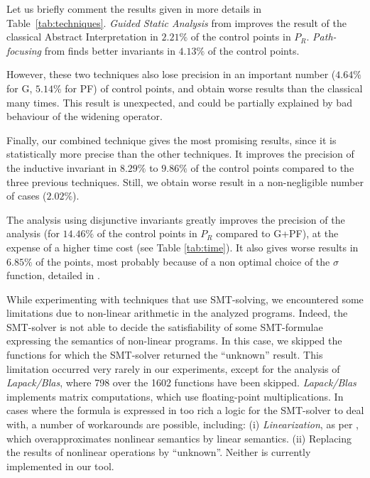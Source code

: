 \documentclass{entcs}
\begin{document}
Let us briefly comment the results given in more details in Table~\ref{tab:techniques}.
\emph{Guided Static Analysis} from \citet{DBLP:conf/sas/GopanR07} improves the
result of the classical Abstract Interpretation in $2.21\%$ of the control points
in $P_R$.
\emph{Path-focusing} from \citet{Monniaux_Gonnord_SAS11} 
finds better invariants in $4.13\%$ of the control points.

However, these two techniques also lose precision in an important number
($4.64\%$ for G, $5.14\%$ for PF) of control points, and obtain worse results
than the classical many times. This result is unexpected, and could be partially
explained by bad behaviour of the widening operator.


Finally, our combined technique gives the most promising results, since it is
statistically more precise than the other techniques. It improves the precision
of the inductive invariant in $8.29\%$ to $9.86\%$ of the control points
compared to the three previous techniques. Still, we obtain worse result in a
non-negligible number of cases ($2.02\%$).

The analysis using disjunctive invariants greatly improves the
precision of the analysis (for $14.46\%$ of the control points in $P_R$ compared
to G+PF), at the expense of a higher time cost (see Table \ref{tab:time}).
It also gives worse results in $6.85\%$ of the points, most probably because of
a non optimal choice of the $\sigma$ function, detailed in
\cite{Henry_Monniaux_Moy_SAS12}.

While experimenting with techniques that use SMT-solving, we encountered some
limitations due to non-linear arithmetic in the analyzed programs. Indeed, 
the SMT-solver is not able to decide the satisfiability of some SMT-formulae
expressing the semantics of non-linear programs. 
In this case, we skipped the functions for which the SMT-solver returned the
``unknown'' result.
This limitation occurred very rarely in our experiments, except for the analysis
of \emph{Lapack/Blas}, where 798 over the 1602 functions have been skipped.
\emph{Lapack/Blas} implements matrix computations, which use floating-point multiplications.
In cases where the formula is expressed in too rich a logic for the SMT-solver to deal with, a number of workarounds are possible, including:
(i) \emph{Linearization}, as per \citet{DBLP:conf/vmcai/Mine06}, which overapproximates nonlinear semantics by linear semantics.
(ii) Replacing the results of nonlinear operations by ``unknown''.
Neither is currently implemented in our tool.
\end{document}
